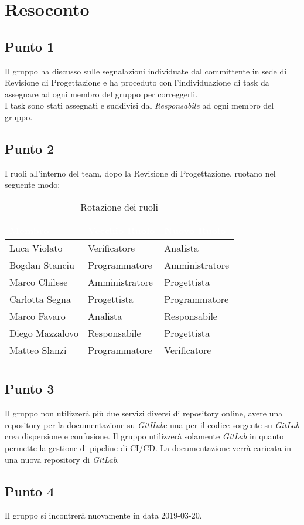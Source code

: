 \section{Resoconto}

\subsection{Punto 1}
Il gruppo ha discusso sulle segnalazioni individuate dal committente in sede di Revisione di Progettazione e ha proceduto con l'individuazione di task da assegnare ad ogni membro del gruppo per correggerli.
\\
I task sono stati assegnati e suddivisi dal \textit{Responsabile} ad ogni membro del gruppo.

\subsection{Punto 2}
I ruoli all'interno del team, dopo la Revisione di Progettazione, ruotano nel seguente modo:\\

\begin{center}
	\begin{longtable}[c]{|m{}|m{}|m{}|} 
		\hline
		\rowcolor{bluelogo}\textbf{\textcolor{white}{Membro}} & \textbf{\textcolor{white}{Vecchio Ruolo}} & \textbf{\textcolor{white}{Nuovo Ruolo}}\\
		\hline
		\hline
		Luca Violato & Verificatore & Analista \\
		\hline
		\rowcolor{grigio}Bogdan Stanciu & Programmatore & Amministratore \\
		\hline
		Marco Chilese & Amministratore & Progettista\\
		\hline
		\rowcolor{grigio}Carlotta Segna & Progettista & Programmatore\\
		\hline
		Marco Favaro & Analista & Responsabile \\
		\hline
		\rowcolor{grigio} Diego Mazzalovo & Responsabile & Progettista\\
		\hline
		Matteo Slanzi & Programmatore & Verificatore\\
		\hline
		\caption{Rotazione dei ruoli}
	\end{longtable}

\end{center}
	

\subsection{Punto 3}
Il gruppo non utilizzerà più due servizi diversi di repository online, avere una repository per la documentazione su \textit{GitHub}\glossario e una per il codice sorgente su \textit{GitLab} crea dispersione e confusione. Il gruppo utilizzerà solamente \textit{GitLab} in quanto permette la gestione di pipeline di CI/CD\glossario. La documentazione verrà caricata in una nuova repository di \textit{GitLab}.

\subsection{Punto 4}
Il gruppo si incontrerà nuovamente in data 2019-03-20.